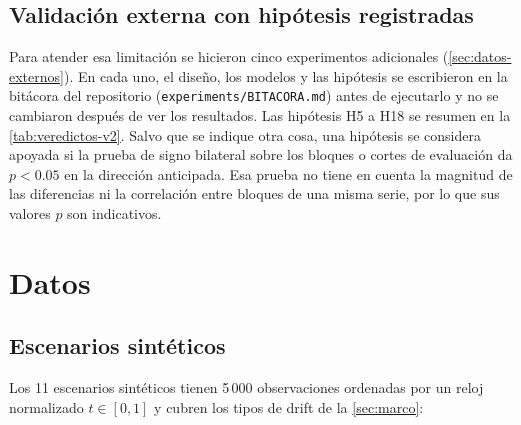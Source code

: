 \documentclass[11pt,a4paper]{article}
\begin{document}
\subsection{Validación externa con hipótesis registradas}\label{sec:hip-externa}

Para atender esa limitación se hicieron cinco experimentos adicionales (\cref{sec:datos-externos}).
En cada uno, el diseño, los modelos y las hipótesis se escribieron en la bitácora del repositorio
(\texttt{experiments/BITACORA.md}) antes de ejecutarlo y no se cambiaron después de ver los resultados.
Las hipótesis H5 a H18 se resumen en la \cref{tab:veredictos-v2}. Salvo que se indique otra cosa, una
hipótesis se considera apoyada si la prueba de signo bilateral sobre los bloques o cortes de evaluación
da $p<0.05$ en la dirección anticipada. Esa prueba no tiene en cuenta la magnitud de las diferencias
ni la correlación entre bloques de una misma serie, por lo que sus valores $p$ son indicativos.

\section{Datos}\label{sec:datos}

\subsection{Escenarios sintéticos}

Los 11 escenarios sintéticos tienen 5\,000 observaciones ordenadas por un reloj normalizado
$t\in[0,1]$ y cubren los tipos de drift de la \cref{sec:marco}:
\end{document}
